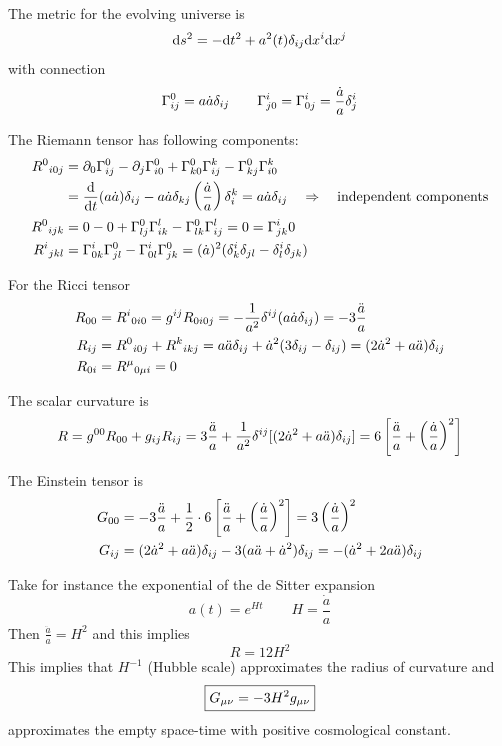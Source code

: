 \documentclass[../main/main.tex]{subfiles}
\begin{document}
\begin{example}
The metric for the evolving universe is
\[\textup{d} s^2=-\textup{d} t^2+a^2(t)\delta_{ij}\textup{d} x^i\textup{d} x^j\]
with connection
\[{\Gamma}^{0}_{i j}=a\dot a\delta_{ij}\qquad{\Gamma}^{i}_{j 0}={\Gamma}^{i}_{0 j}=\frac{\dot a}a\delta^i_j\]

The Riemann tensor has following components:
\begin{align*}
{{R}^{0}}_{i 0 j}&=\partial_{0}{\Gamma}^{0}_{i j}-\partial_{j}{\Gamma}^{0}_{i 0}+{\Gamma}^{0}_{k 0}{\Gamma}^{k}_{i j}-{\Gamma}^{0}_{k j}{\Gamma}^{k}_{i 0}\\
&=\frac{\textup{d} }{\textup{d} t}(a\dot a)\delta_{ij}-a\dot a\delta_{kj}\left(\frac{\dot a}a\right)\delta^k_i=a\dot a\delta_{ij}
\quad\Rightarrow\quad\text{independent components}\\
{{R}^{0}}_{i j k}&=0-0+{\Gamma}^{0}_{l j}{\Gamma}^{l}_{i k}-{\Gamma}^{0}_{l k}{\Gamma}^{l}_{i j}=0={\Gamma}^{i}_{j k}0\\
{{R}^{i}}_{j k l}&={\Gamma}^{i}_{0 k}{\Gamma}^{0}_{j l}-{\Gamma}^{i}_{0 l}{\Gamma}^{0}_{j k}=(\dot a)^2(\delta^i_k\delta_{jl}-\delta^i_l\delta_{jk})
\end{align*}

For the Ricci tensor
\begin{align*}
R_{0 0}&={{R}^{i}}_{0 i 0}=g^{i j}{R}_{0 i 0 j}=-\frac1{a^2}\delta^{ij}(a\dot a\delta_{ij})=-3\frac{\ddot a}{a}\\
R_{i j}&={{R}^{0}}_{i 0 j}+{{R}^{k}}_{i k j}=a\ddot a\delta_{ij}+\dot a^2(3\delta_{ij}-\delta_{ij})=(2\dot a^2+a\ddot a)\delta_{ij}\\
R_{0 i}&={{R}^{\mu}}_{0 \mu i}=0
\end{align*}

The scalar curvature is
\[R=g^{0 0}R_{0 0}+g_{i j}R_{i j}=3\frac{\ddot a}a+\frac1{a^2}\delta^{ij}[(2\dot a^2+a\ddot a)\delta_{ij}]=6\left[\frac{\ddot a}a+\left(\frac{\dot a}a\right)^2\right]\]

The Einstein tensor is 
\begin{align*}
G_{0 0}&=-3\frac{\ddot a}a+\frac12\cdot 6\left[\frac{\ddot a}a+\left(\frac{\dot a}a\right)^2\right]=3\left(\frac{\dot a}a\right)^2\\
G_{i j}&=(2\dot a^2+a\ddot a)\delta_{ij}-3(a\ddot a+\dot a^2)\delta_{ij}=-(\dot a^2+2a\ddot a)\delta_{ij}
\end{align*}

Take for instance the exponential of the de Sitter expansion
\[a(t)=e^{Ht}\qquad H=\frac{\dot a}a\]
Then $\frac{\ddot a}a=H^2$ and this implies
\begin{equation}\boxed{
R=12H^2
}\end{equation}
This implies that $H^{-1}$ (Hubble scale) approximates the radius of curvature and
\begin{equation}\boxed{
G_{\mu \nu}=-3H^2g_{\mu \nu}
}\end{equation}
approximates the empty space-time with positive cosmological constant. 

\end{example}
\end{document}
